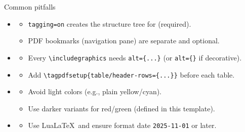 \begin{frame}{Common pitfalls}

\begin{itemize}
\item {}
  \begin{itemize}
  \item \texttt{tagging=on} creates the structure tree for  (required).
  \item PDF bookmarks (navigation pane) are separate and optional.
  \end{itemize}

\item {}
  \begin{itemize}
  \item Every \texttt{\textbackslash includegraphics} needs \texttt{alt=\{...\}} (or \texttt{alt=\{\}} if decorative).
  \end{itemize}

\item {}
  \begin{itemize}
  \item Add \texttt{\textbackslash tagpdfsetup\{table/header-rows=\{...\}\}} before each table.
  \end{itemize}

\item {}
  \begin{itemize}
  \item Avoid light colors (e.g., plain yellow/cyan).
  \item Use darker variants for red/green (defined in this template).
  \end{itemize}

\item {}
  \begin{itemize}
  \item Use Lua\LaTeX\ and ensure format date \texttt{2025-11-01} or later.
  \end{itemize}
\end{itemize}
\end{frame}

